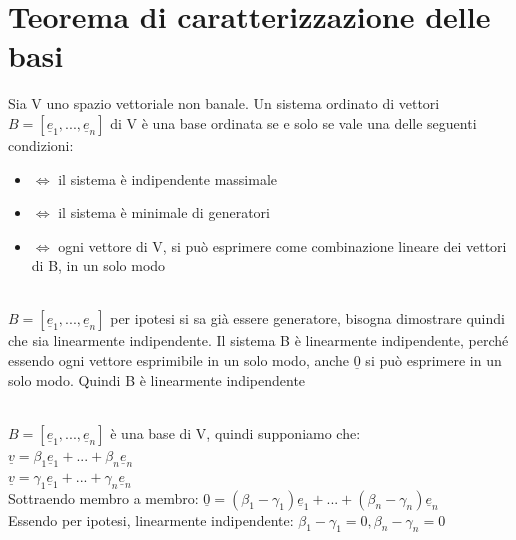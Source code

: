 \section{Teorema di caratterizzazione delle basi}
\begin{teorema}
	Sia V uno spazio vettoriale non banale. Un sistema ordinato di vettori $B=[\underline{e}_1,...,\underline{e}_n]$ di V è una base ordinata se e solo se vale una delle seguenti condizioni:
	\begin{itemize}
		\item $\Longleftrightarrow$ il sistema è indipendente massimale
		\item $\Longleftrightarrow$ il sistema è minimale di generatori
		\item $\Longleftrightarrow$ ogni vettore di V, si può esprimere come combinazione lineare dei vettori di B, in un solo modo
	\end{itemize}
	\begin{dimostrazione}
		\phantom{}\\
		$B=[\underline{e}_1,...,\underline{e}_n]$ per ipotesi si sa già essere generatore, bisogna dimostrare quindi che sia linearmente indipendente. Il sistema B è linearmente indipendente, perché essendo ogni vettore esprimibile in un solo modo, anche $\underline{0}$ si può esprimere in un solo modo. Quindi B è linearmente indipendente
	\end{dimostrazione}
	\begin{dimostrazione}
		\phantom{}\\
		$B=[\underline{e}_1,...,\underline{e}_n]$ è una base di V, quindi supponiamo che:\\
		$\underline{v}=\beta_1 \underline{e}_1+...+\beta_n \underline{e}_n$\\
		$\underline{v}=\gamma_1 \underline{e}_1+...+\gamma_n \underline{e}_n$\\
		Sottraendo membro a membro: $\underline{0}=(\beta_1-\gamma_1)\underline{e}_1+...+(\beta_n-\gamma_n)\underline{e}_n$\\
		Essendo per ipotesi, linearmente indipendente: $\beta_1-\gamma_1=0, \beta_n-\gamma_n=0$
	\end{dimostrazione}
\end{teorema}

